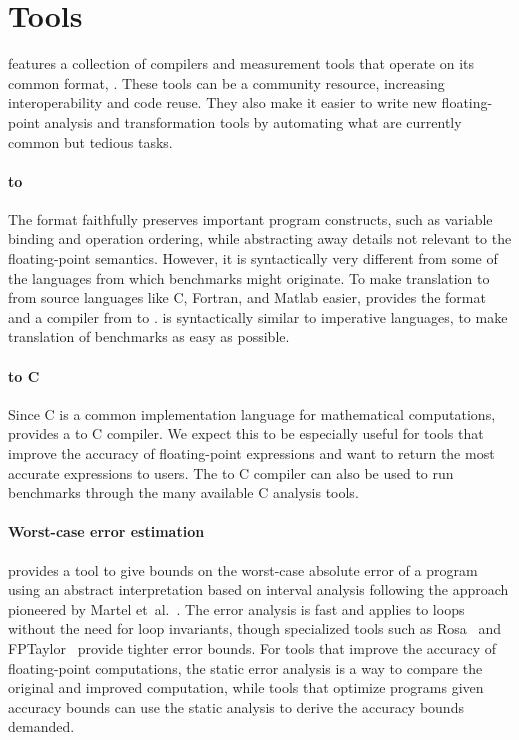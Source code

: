 \documentclass[main.tex]{subfiles}
\begin{document}
\section{Tools}
\label{sec:tools}

\name features
  a collection of compilers and measurement tools
  that operate on its common format, \core.
These tools can be a community resource,
  increasing interoperability and code reuse.
They also make it easier to write
  new floating-point analysis and transformation tools
  by automating what are currently
  common but tedious tasks.

\paragraph{\surface to \core}
The \core format faithfully preserves important program constructs,
  such as variable binding and operation ordering,
  while abstracting away details not relevant
  to the floating-point semantics.
However, it is syntactically very different
  from some of the languages from which benchmarks might originate.
To make translation to \core from source languages
  like C, Fortran, and Matlab easier,
  \name provides the \surface format
  and a compiler from \surface to \core.
\surface is syntactically similar to imperative languages,
  to make translation of benchmarks as easy as possible.

\paragraph{\core to C}
Since C is a common implementation language for mathematical computations,
  \name provides a \core to C compiler.
We expect this to be especially useful for tools
  that improve the accuracy of floating-point expressions
  and want to return the most accurate expressions to users.
The \core to C compiler can also be used
  to run \name benchmarks through the many available C analysis tools.

\paragraph{Worst-case error estimation}
\name provides a tool to give bounds on
  the worst-case absolute error of a \core program
  using an abstract interpretation based on interval analysis
  following the approach pioneered by Martel et~al.~\cite{martel-ai}.
The error analysis is fast
  and applies to loops without the need for loop invariants,
  though specialized tools such as Rosa~\cite{DarulovaK14}
  and FPTaylor~\cite{fptaylor-fm15}
  provide tighter error bounds.
For tools that improve the accuracy of floating-point computations,
  the static error analysis is a way to compare
  the original and improved computation,
  while tools that optimize programs given accuracy bounds
  can use the static analysis to derive the accuracy bounds demanded.
\end{document}
